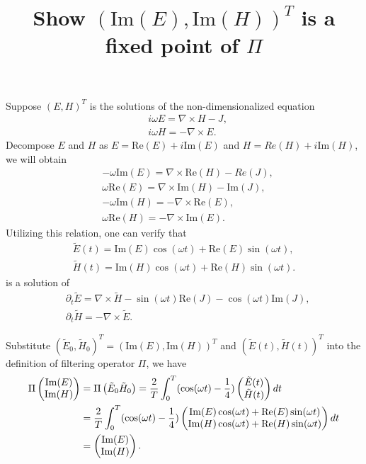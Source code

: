 \documentclass[10pt]{article}
\begin{document}
\title{Show $(\textrm{Im}(E),\textrm{Im}(H))^T$ is a fixed point of $\Pi$}
\maketitle
Suppose $(E,H)^T$ is the solutions of the non-dimensionalized equation
\begin{align}
&i\omega E = \nabla\times H-J,\\
&i\omega H = -\nabla\times E.
\end{align}
Decompose $E$ and $H$ as $E=\textrm{Re}(E)+i \textrm{Im}(E)$ and $H=Re(H)+i \textrm{Im}(H)$, we will obtain 
\begin{align}
&-\omega \textrm{Im}(E) = \nabla\times \textrm{Re}(H)-Re(J), \\
& \omega \textrm{Re}(E) = \nabla\times \textrm{Im}(H)-\textrm{Im}(J), \\
&-\omega \textrm{Im}(H) = -\nabla\times \textrm{Re}(E), \\
&\omega  \textrm{Re}(H) = -\nabla\times \textrm{Im}(E). 
\end{align}
Utilizing this relation, one can verify that 
\begin{align}
\tilde{E}(t) = \textrm{Im}(E) \cos(\omega t) + \textrm{Re}(E) \sin(\omega t), \\
\tilde{H}(t) = \textrm{Im}(H) \cos (\omega t) + \textrm{Re}(H) \sin (\omega t).
\end{align}
is a solution of
\begin{align}
&\partial_t \tilde{E} =  \nabla\times \tilde{H}- \sin(\omega t)\textrm{Re}(J)-\cos(\omega t) \textrm{Im}(J),\\
&\partial_t \tilde{H} = -\nabla\times \tilde{E}.
\end{align}


Substitute $( \tilde{E}_0,\tilde{H}_0)^T=(\textrm{Im}(E),\textrm{Im}(H))^T$ and $( \tilde{E}(t),\tilde{H}(t) )^T$ into the definition of filtering operator $\Pi$, we have
\begin{align}
\Pi \left(\begin{matrix}
\textrm{Im}(E)\\
\textrm{Im}(H)
\end{matrix}\right)&=
\Pi \left(\begin{matrix}
\tilde{E}_0
\tilde{H}_0
\end{matrix}\right)
=  \frac{2}{T}\int_{0}^T 
(\cos(\omega t)-\frac{1}{4})
\left(\begin{matrix}
\tilde{E}(t)\\
\tilde{H}(t)
\end{matrix}\right)dt\notag\\
&=\frac{2}{T}\int_{0}^T 
(\cos(\omega t)-\frac{1}{4})
\left(\begin{matrix}
\textrm{Im}(E) \cos(\omega t) + \textrm{Re}(E) \sin(\omega t)\\
\textrm{Im}(H) \cos (\omega t) + \textrm{Re}(H) \sin (\omega t)
\end{matrix}\right)dt\notag\\
&=\left(\begin{matrix}
\textrm{Im}(E)\\
\textrm{Im}(H)
\end{matrix}\right).
\end{align}
\end{document}

